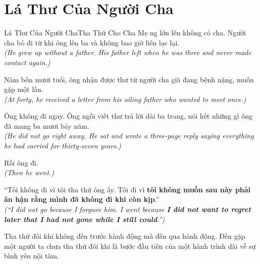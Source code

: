 \section{Lá Thư Của Người Cha}
\begin{truyen}{Lá Thư Của Người Cha}{Tha Thứ Cho Cha Mẹ}
ng lớn lên không có cha. Người cha bỏ đi từ khi ông lên ba và không bao giờ liên lạc lại.\\
\textit{(He grew up without a father. His father left when he was three and never made contact again.)}

Năm bốn mươi tuổi, ông nhận được thư từ người cha già đang bệnh nặng, muốn gặp một lần.\\
\textit{(At forty, he received a letter from his ailing father who wanted to meet once.)}

Ông không đi ngay. Ông ngồi viết thư trả lời dài ba trang, nói hết những gì ông đã mang ba mươi bảy năm.\\
\textit{(He did not go right away. He sat and wrote a three-page reply saying everything he had carried for thirty-seven years.)}

Rồi ông đi.\\
\textit{(Then he went.)}

``Tôi không đi vì tôi tha thứ ông ấy. Tôi đi vì \textbf{tôi không muốn sau này phải ân hận rằng mình đã không đi khi còn kịp}.''\\
\textit{(``I did not go because I forgave him. I went because \textbf{I did not want to regret later that I had not gone while I still could}.'')}
\end{truyen}
\begin{baihoc}
  Tha thứ đôi khi không đến trước hành động mà đến qua hành động. Đến gặp một người ta chưa tha thứ đôi khi là bước đầu tiên của một hành trình dài về sự bình yên nội tâm.
\end{baihoc}

